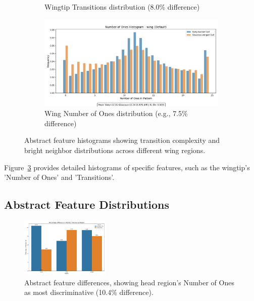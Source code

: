 \documentclass[a4paper,12pt]{report}
\begin{document}
\begin{figure}[H]
\begin{subfigure}[b]{0.49\textwidth}
        \caption{Wingtip Transitions distribution (8.0\% difference)}
        \label{fig:wingtip_transitions}
    \end{subfigure}
    \hfill
    \begin{subfigure}[b]{0.49\textwidth}
        \includegraphics[width=\textwidth]{images/LBP/default_wing_ones_histogram.png}
        \caption{Wing Number of Ones distribution (e.g., 7.5\% difference)}
        \label{fig:wing_ones}
    \end{subfigure}
    \caption{Abstract feature histograms showing transition complexity and bright neighbor distributions across different wing regions.}
    \label{fig:feature_histograms}
\end{figure}


Figure~\ref{fig:feature_histograms} provides detailed histograms of specific features, such as the wingtip's 'Number of Ones' and 'Transitions'.

\subsection{Abstract Feature Distributions}
\begin{figure}[H]
    \centering
    \includegraphics[width=0.38\textwidth]{images/LBP/default_feature_diff_barchart.png}
    \caption{Abstract feature differences, showing head region's Number of Ones as most discriminative (10.4\% difference).}
    \label{fig:abstract_features}
\end{figure}
\end{document}
